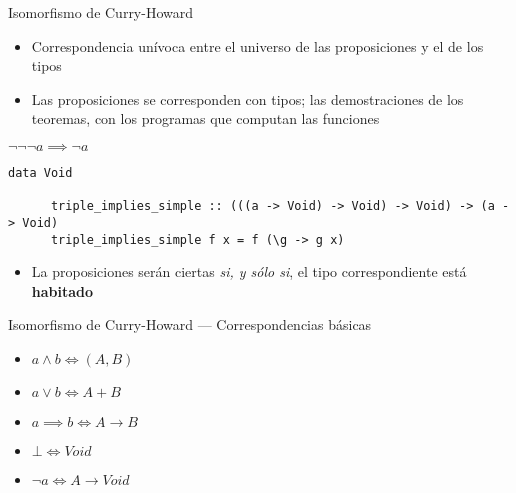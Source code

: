 \documentclass[10pt]{beamer}
\begin{document}
\begin{frame}[fragile]{Isomorfismo de Curry-Howard}

  \begin{itemize}
  \item Correspondencia unívoca entre el universo de las proposiciones
    y el de los tipos
  \item Las proposiciones se corresponden con tipos; las
    demostraciones de los teoremas, con los programas que computan las
    funciones
  \end{itemize}
  \begin{minipage}{0.25\textwidth}
    \begin{center}
      $\neg \neg \neg a \implies \neg a$
    \end{center}
  \end{minipage}
  \begin{minipage}{0.65\textwidth}
    \begin{center}
      \begin{lstlisting}[basicstyle=\tiny]
      data Void

      triple_implies_simple :: (((a -> Void) -> Void) -> Void) -> (a -> Void)
      triple_implies_simple f x = f (\g -> g x)
      \end{lstlisting}
    \end{center}
  \end{minipage}
  \begin{itemize}
  \item La proposiciones serán ciertas \textit{si, y sólo si}, el tipo
    correspondiente está \textbf{habitado}
  \end{itemize}

\end{frame}

\begin{frame}[fragile]{Isomorfismo de Curry-Howard --- Correspondencias básicas}

  \begin{itemize}
  \item $a \land b \iff (A, B)$
  \item $a \lor b \iff A + B$
  \item $a \implies b \iff A \rightarrow B$
  \item $\bot \iff Void$
  \item $\neg a \iff A \rightarrow Void$
  \end{itemize}

\end{frame}
\end{document}
